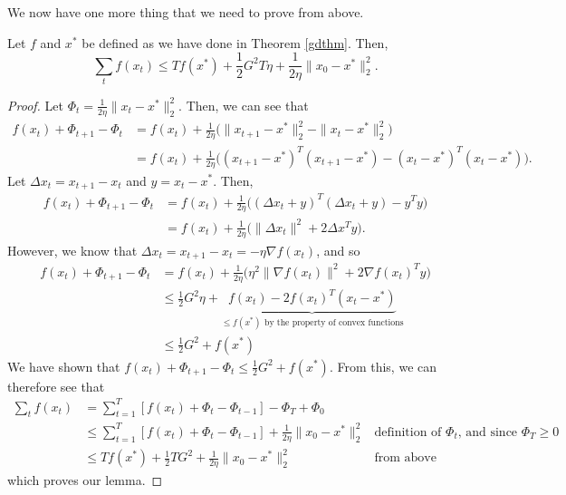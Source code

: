 \documentclass[12pt]{article}
\begin{document}
We now have one more thing that we need to prove from above. 
\begin{lemma}
	\label{gdlma}	
	Let $f$ and $x^*$ be defined as we have done in Theorem \ref{gdthm}. Then, $$\sum_{t} f(x_t) \leq Tf(x^*) + \frac{1}{2}G^2T\eta + \frac{1}{2\eta}\|x_0 - x^*\|_2^2.$$
\end{lemma}
\begin{proof}
	Let $\Phi_t = \frac{1}{2\eta} \|x_t -x^*\|_2^2$. Then, we can see that
	\begin{align*}
		f(x_t) + \Phi_{t+1} - \Phi_t &= f(x_t) + \frac{1}{2\eta} \bigg( \|x_{t+1} -x^*\|_2^2 -  \|x_t -x^*\|_2^2\bigg) \\
		&= f(x_t) + \frac{1}{2\eta} \bigg( (x_{t+1} -x^*)^T (x_{t+1} -x^*) -  (x_{t} -x^*)^T (x_{t} -x^*)\bigg).
	\end{align*}
	Let $\Delta x_t = x_{t+1} - x_t$ and $y = x_t - x^*$. Then, 
	\begin{align*}
	f(x_t) + \Phi_{t+1} - \Phi_t &= f(x_t) + \frac{1}{2\eta} \bigg( (\Delta x_t + y)^T(\Delta x_t + y) -y^Ty \bigg) \\
	&= f(x_t) + \frac{1}{2\eta} \bigg( \|\Delta x_t\|^2 + 2\Delta x^Ty\bigg).
	\end{align*}
	However, we know that $\Delta x_t = x_{t+1} - x_t = -\eta \nabla f(x_t)$, and so
	\begin{align*}
			f(x_t) + \Phi_{t+1} - \Phi_t &= f(x_t) + \frac{1}{2\eta} \bigg( \eta^2 \|\nabla f(x_t)\|^2 + 2\nabla f(x_t)^Ty\bigg) \\
			&\leq \frac{1}{2}G^2 \eta + \underbrace{f(x_t) - 2f(x_t)^T(x_t - x^*)}_\text{$\leq f(x^*)$ by the property of convex functions} \\
			&\leq \frac{1}{2}G^2 + f(x^*)
	\end{align*}
	We have shown that $f(x_t) + \Phi_{t+1} - \Phi_t \leq \frac{1}{2}G^2 + f(x^*)$. From this, we can therefore see that
	\begin{align*}
		\sum_{t} f(x_t) &= \sum_{t=1}^{T} [f(x_t) + \Phi_t - \Phi_{t-1}] - \Phi_T + \Phi_0 \\
		&\leq \sum_{t=1}^{T} [f(x_t) + \Phi_t - \Phi_{t-1}] + \frac{1}{2\eta}\|x_0 - x^*\|_2^2 &\text{definition of $\Phi_t$, and since $\Phi_T \geq 0$} \\
		&\leq Tf(x^*) + \frac{1}{2}TG^2 + \frac{1}{2\eta}\|x_0 - x^*\|_2^2 &\text{from above}
	\end{align*}
	which proves our lemma.
\end{proof}
\end{document}
